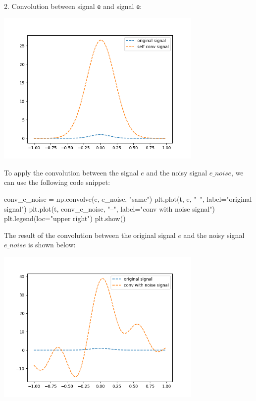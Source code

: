 \documentclass[a4paper, 10pt]{article}
\begin{document}
\begin{subproblems}[start=1]
    \newpage

    2. Convolution between signal \texttt{e} and signal \texttt{e}:
    \begin{center}
        \includegraphics[width=0.75\textwidth]{images/problem_6_1_self_conv_signal.png}
    \end{center}
\end{subproblems}

\begin{solution}
To apply the convolution between the signal \( e \) and the noisy signal \( e\_noise \), we can use the following code snippet:

\begin{codingbox}
conv_e_noise = np.convolve(e, e_noise, "same")
plt.plot(t, e, "--", label="original signal")
plt.plot(t, conv_e_noise, "--", label="conv with noise signal")
plt.legend(loc="upper right")
plt.show()
\end{codingbox}

The result of the convolution between the original signal \( e \) and the noisy signal \( e\_noise \) is shown below:
\begin{center}
    \includegraphics[width=0.75\textwidth]{images/problem_6_1_conv_with_noise_signal.png}
\end{center}
\end{solution}
\end{document}
